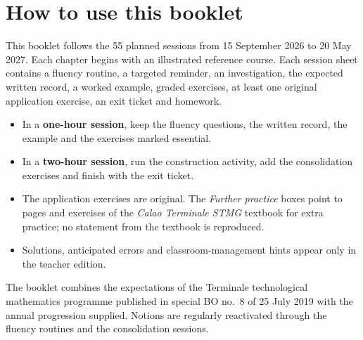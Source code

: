 \chapter*{How to use this booklet}
This booklet follows the 55 planned sessions from 15 September 2026 to 20 May 2027. Each chapter begins with an illustrated reference course. Each session sheet contains a fluency routine, a targeted reminder, an investigation, the expected written record, a worked example, graded exercises, at least one original application exercise, an exit ticket and homework.

\begin{itemize}
\item In a \textbf{one-hour session}, keep the fluency questions, the written record, the example and the exercises marked essential.
\item In a \textbf{two-hour session}, run the construction activity, add the consolidation exercises and finish with the exit ticket.
\item The application exercises are original. The \emph{Further practice} boxes point to pages and exercises of the \emph{Calao Terminale STMG} textbook for extra practice; no statement from the textbook is reproduced.
\item Solutions, anticipated errors and classroom-management hints appear only in the teacher edition.
\end{itemize}

\begin{keypoint}
The booklet combines the expectations of the Terminale technological mathematics programme published in special BO no.~8 of 25 July 2019 with the annual progression supplied. Notions are regularly reactivated through the fluency routines and the consolidation sessions.
\end{keypoint}

\tableofcontents
